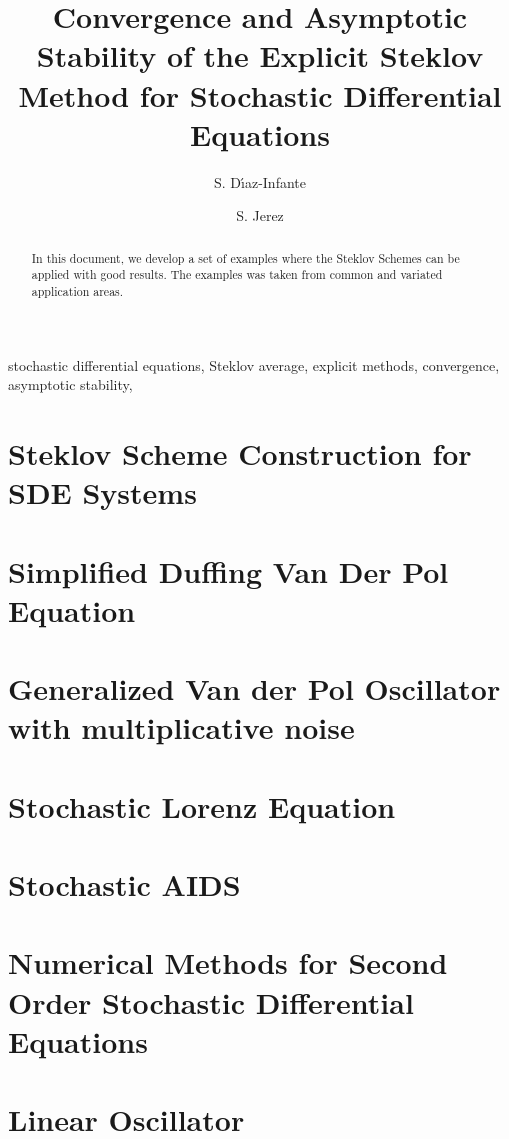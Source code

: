 \documentclass[print]{elsarticle}
\begin{document}
	\begin{frontmatter}
		\title{Convergence and Asymptotic Stability  of  the Explicit
		Steklov Method for Stochastic Differential Equations 
		}%
		\author[sj]{S. D\'{\i}az-Infante}
		\author[sj]{S. Jerez}
		\address[sj]{
		Department of Applied Mathematics, CIMAT, Guanajuato, Gto., Mexico,
		36240.
		}
		\begin{abstract}
			In this document, we develop a set of examples where the Steklov Schemes can be applied
			with good results. The examples was taken from common and variated application areas.
		\end{abstract}
		\begin{keyword}
			stochastic differential equations, Steklov average,
			explicit methods, convergence, asymptotic stability,
		\end{keyword}
	\end{frontmatter}
	\section{Steklov Scheme Construction for SDE Systems }
		
		
	\section{Simplified Duffing Van Der Pol Equation}
		
	\section{Generalized Van der Pol Oscillator with multiplicative noise}
		
	\section{Stochastic Lorenz Equation}
		
	\section{Stochastic AIDS}
		
	\section{Numerical Methods for Second Order Stochastic Differential Equations}
		
	\section{Linear Oscillator}
		
	\clearpage
	\section*{\refname}
	
	
\end{document}
